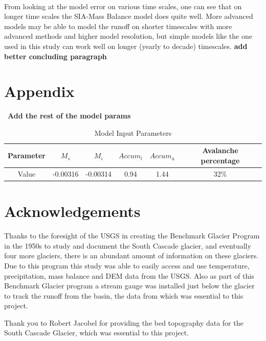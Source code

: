 \documentclass{article}
\begin{document}
\paragraph{}
From looking at the model error on various time scales, one can see that on longer time scales the SIA-Mass Balance model does quite well. More 
advanced models may be able to model the runoff on shorter timescales with more advanced methods and higher model resolution, but simple models 
like the one used in this study can work well on longer (yearly to decade) timescales.
\textbf{add better concluding paragraph}

\section*{Appendix}\
\textbf{Add the rest of the model params}
\begin{table}[h!]
    \centering
    \begin{tabular}{|c|c|c|c|c|c|}
        \hline
        Parameter & $M_s$ &$M_i$ & ${Accum}_l$ & ${Accum}_u$ & Avalanche percentage \\
        \hline
        Value & -0.00316 & -0.00314 & 0.94 & 1.44 & 32\%  \\
        \hline
    \end{tabular}
    \caption{Model Input Parameters}
    \label{tab:model_input_parameters}
\end{table}

\section*{Acknowledgements}
Thanks to the foresight of the USGS in creating the Benchmark Glacier Program in the 1950s to study and document the South Cascade glacier, 
and eventually four more glaciers, there is an abundant amount of information on these glaciers. Due to this program this study was able to 
easily access and use temperature, precipitation, mass balance and DEM data from the USGS. Also as part of this Benchmark Glacier program a 
stream gauge was installed just below the glacier to track the runoff from the basin, the data from which was essential to this project.

Thank you to Robert Jacobel for providing the bed topography data for the South Cascade Glacier, which was essential to this project.
\end{document}
